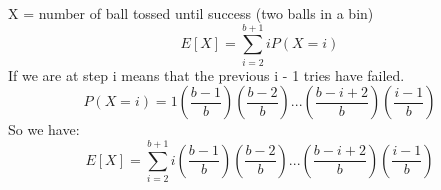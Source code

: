X = number of ball tossed until success (two balls in a bin)\\
\begin{equation*}
    E[X] = \sum_{i = 2}^{b + 1}iP(X = i)
\end{equation*}
If we are at step i means that the previous i - 1 tries have failed.\\
\begin{equation*}
    P(X = i) = 1(\frac{b -1 }{b})(\frac{b - 2}{b})...(\frac{b - i + 2}{b})(\frac{i - 1}{b})
\end{equation*}
So we have:
\begin{equation*}
    E[X] = \sum_{i = 2}^{b + 1}i(\frac{b -1 }{b})(\frac{b - 2}{b})...(\frac{b - i + 2}{b})(\frac{i - 1}{b})
\end{equation*}
